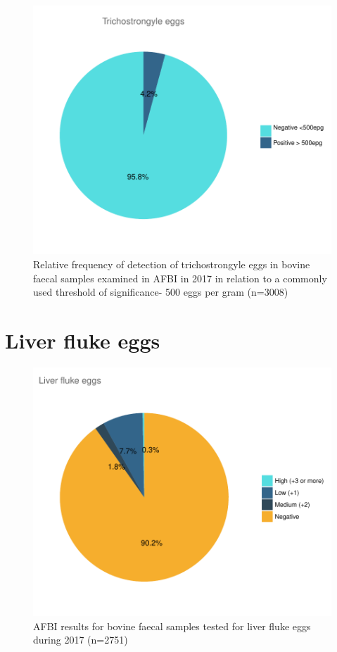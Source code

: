 \documentclass[]{book}
\begin{document}
\begin{figure}

{\centering \includegraphics{AFBI_files/figure-latex/unnamed-chunk-53-1} 

}

\caption{Relative frequency of detection of trichostrongyle eggs in bovine faecal samples examined in AFBI in 2017 in relation to a commonly used threshold of significance- 500 eggs per gram (n=3008)}\label{fig:unnamed-chunk-53}
\end{figure}

\section{Liver fluke eggs}\label{liver-fluke-eggs}

\begin{figure}

{\centering \includegraphics{AFBI_files/figure-latex/unnamed-chunk-55-1} 

}

\caption{AFBI results for bovine faecal samples tested for liver fluke eggs during 2017 (n=2751)}\label{fig:unnamed-chunk-55}
\end{figure}
\end{document}

